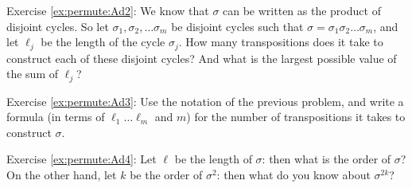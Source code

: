 \noindent Exercise \ref{ex:permute:Ad2}: We know that $\sigma$ can be written as the product of disjoint cycles. So let $\sigma_1, \sigma_2, \ldots \sigma_m$ be disjoint cycles such that  $\sigma = \sigma_1 \sigma_2 \ldots \sigma_m$, and let $\ell_j$ be the length of the cycle $\sigma_j$. How many transpositions does it take to construct each of these disjoint cycles? And what is the largest possible value of the sum of $\ell_j$?

\noindent Exercise \ref{ex:permute:Ad3}: Use the notation of the previous problem, and write a formula (in terms of $\ell_1 \ldots \ell_m$ and $m$) for the number of transpositions it takes to construct $\sigma$.

\noindent Exercise \ref{ex:permute:Ad4}: Let $\ell$ be the length of $\sigma$: then what is the order of $\sigma$? On the other hand, let $k$ be the order of $\sigma^2$: then what do you know about $\sigma^{2k}$?
